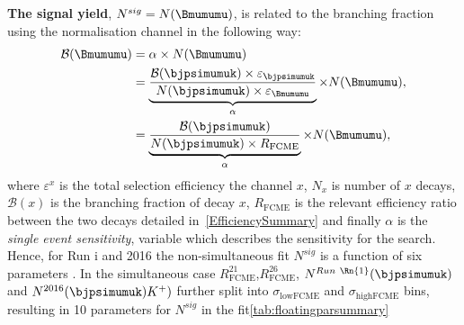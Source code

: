\textbf{The signal yield}\DIFdelbegin {}\DIFdelend , $N^{sig}=N(\Bmumumu)$, is \DIFaddbegin {}\DIFaddend related to the branching fraction using the normalisation channel in the following way:
\begin{equation}
\begin{split}
\mathcal{B}(\Bmumumu)&=\alpha \times N(\Bmumumu)\\
&=\underbrace{\frac{\mathcal{B}(\bjpsimumuk) \times \varepsilon_{\bjpsimumuk}}{N(\bjpsimumuk) \times \varepsilon_{\Bmumumu}}}_{\text{$\alpha$}} \times N(\Bmumumu),\\
&=\underbrace{\frac{\mathcal{B}(\bjpsimumuk)}{N(\bjpsimumuk) \times  R_{\mathrm{FCME}}}}_{\text{$\alpha$}} \times N(\Bmumumu),\\
\end{split}
\label{eq:sigeq}
\end{equation}
where  $\varepsilon^{x}$ is the total selection efficiency \DIFdelbegin {}\DIFdelend \DIFaddbegin {}\DIFaddend the channel $x$, $N_{x}$ is \DIFaddbegin {}\DIFaddend number of $x$ decays, $\mathcal{B}(x)$ is the branching fraction of decay $x$, $R_{\mathrm{FCME}}$ is the relevant efficiency ratio between the two decays detailed in~\autoref{EfficiencySummary} and finally $\alpha$ is the \textit{single event sensitivity}, \DIFaddbegin {}\DIFaddend variable which describes the sensitivity for the search. Hence, for Run \Rn{1} and 2016 the non-simultaneous fit $N^{sig}$ is a function of six parameters \DIFdelbegin {}\DIFdelend \DIFaddbegin {}\DIFaddend . In the simultaneous case $R^{21}_{\mathrm{FCME}}$,$R^{26}_{\mathrm{FCME}}$, $N^{Run\ \Rn{1}}(\bjpsimumuk)$ and $N^{2016}(\bjpsimumuk) K^{+})$ \DIFdelbegin {}\DIFdelend \DIFaddbegin {}\DIFaddend further split into $\sigma_{\mathrm{lowFCME}}$ and $\sigma_{\mathrm{highFCME}}$ bins, resulting in 10 parameters for $N^{sig}$ in the fit\DIFdelbegin {}\DIFdelend \DIFaddbegin {}\autoref{tab:floatingparsummary}\Bmumumu{}\Bmumumu{}\DIFaddend 



